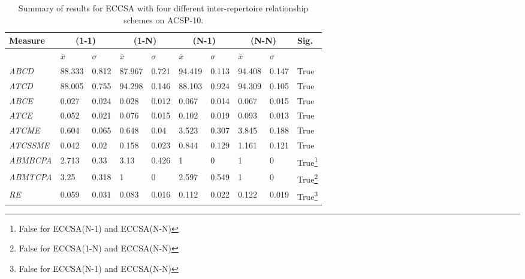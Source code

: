 \begin{table}
	\centering\small
		\begin{minipage}{\textwidth}
		\begin{tabular}{llllllllll}
		\toprule
		\textbf{Measure} & \multicolumn{2}{c}{\textbf{(1-1)}} & \multicolumn{2}{c}{\textbf{(1-N)}} & \multicolumn{2}{c}{\textbf{(N-1)}} & \multicolumn{2}{c}{\textbf{(N-N)}} & \textbf{Sig.} \\ 
		\midrule
		 & $\bar{x}$ & $\sigma$ & $\bar{x}$ & $\sigma$ & $\bar{x}$ & $\sigma$ & $\bar{x}$ & $\sigma$ &  \\ 
		\toprule
		\emph{ABCD} & 88.333 & 0.812 & 87.967 & 0.721 & 94.419 & 0.113 & 94.408 & 0.147 & True \\ 
		\emph{ATCD} & 88.005 & 0.755 & 94.298 & 0.146 & 88.103 & 0.924 & 94.309 & 0.105 & True \\ 
		\emph{ABCE} & 0.027 & 0.024 & 0.028 & 0.012 & 0.067 & 0.014 & 0.067 & 0.015 & True \\ 
		\emph{ATCE} & 0.052 & 0.021 & 0.076 & 0.015 & 0.102 & 0.019 & 0.093 & 0.013 & True \\ 
		\emph{ATCME} & 0.604 & 0.065 & 0.648 & 0.04 & 3.523 & 0.307 & 3.845 & 0.188 & True \\ 
		\emph{ATCSSME} & 0.042 & 0.02 & 0.158 & 0.023 & 0.844 & 0.129 & 1.161 & 0.121 & True \\ 
		\emph{ABMBCPA} & 2.713 & 0.33 & 3.13 & 0.426 & 1 & 0 & 1 & 0 & True\footnote{False for ECCSA(N-1) and ECCSA(N-N)} \\ 
		\emph{ABMTCPA} & 3.25 & 0.318 & 1 & 0 & 2.597 & 0.549 & 1 & 0 & True\footnote{False for ECCSA(1-N) and ECCSA(N-N)} \\ 
		\emph{RE} & 0.059 & 0.031 & 0.083 & 0.016 & 0.112 & 0.022 & 0.122 & 0.019 & True\footnote{False for ECCSA(N-1) and ECCSA(N-N)} \\ 
		\bottomrule
		\end{tabular}
		\end{minipage}
	\caption{Summary of results for ECCSA with four different inter-repertoire relationship schemes on ACSP-10.}
	\label{tab:cells:mccsa:relationships}
\end{table}

